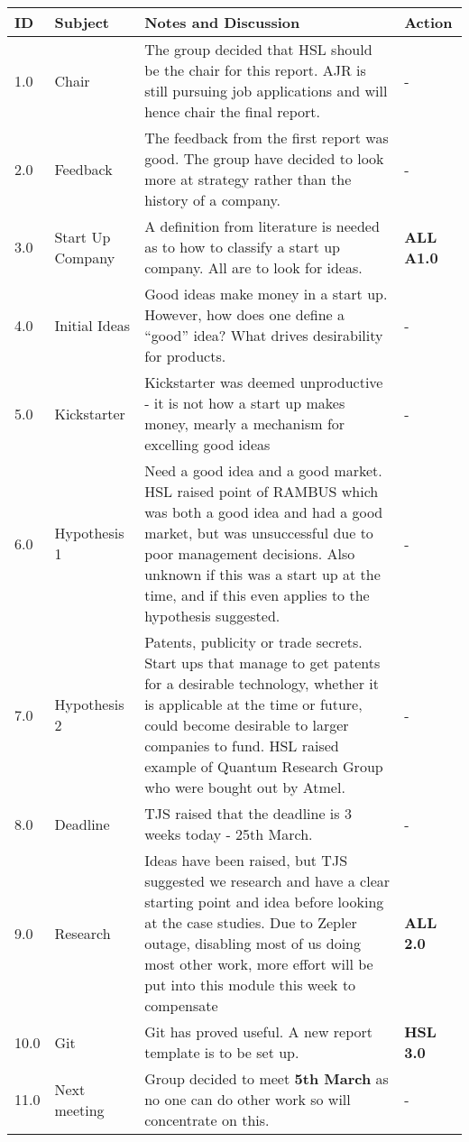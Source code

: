 \begin{center}
\begin{longtable}{| p{} |>{\raggedright\arraybackslash}p{} | p{} |>{\raggedright\arraybackslash}p{}|} \hline
\textbf{ID} & \textbf{Subject} & \textbf{Notes and Discussion} & \textbf{Action} \\ \hline
\endhead
1.0	&	Chair	&	The group decided that HSL should be the chair for this report. AJR is still pursuing job applications and will hence chair the final report. 	&   -	 \\ \hline
2.0	&	Feedback & The feedback from the first report was good. The group have decided to look more at strategy rather than the history of a company. & - \\ \hline
3.0 & Start Up Company & A definition from literature is needed as to how to classify a start up company. All are to look for ideas. &  \textbf{ALL A1.0} \\ \hline

4.0 & Initial Ideas & Good ideas make money in a start up. However, how does one define a ``good'' idea? What drives desirability for products. & - \\ \hline
5.0 & Kickstarter & Kickstarter was deemed unproductive - it is not how a start up makes money, mearly a mechanism for excelling good ideas & - \\ \hline
6.0 & Hypothesis 1 & Need a good idea and a good market. HSL raised point of RAMBUS which was both a good idea and had a good market, but was unsuccessful due to poor management decisions. Also unknown if this was a start up at the time, and if this even applies to the hypothesis suggested. & - \\ \hline
7.0 & Hypothesis 2 & Patents, publicity or trade secrets. Start ups that manage to get patents for a desirable technology, whether it is applicable at the time or future, could become desirable to larger companies to fund. HSL raised example of Quantum Research Group who were bought out by Atmel. & - \\ \hline

8.0 & Deadline & TJS raised that the deadline is 3 weeks today - 25th March. & - \\ \hline

9.0 & Research & Ideas have been raised, but TJS suggested we research and have a clear starting point and idea before looking at the case studies. Due to Zepler outage, disabling most of us doing most other work, more effort will be put into this module this week to compensate & \textbf{ALL 2.0} \\ \hline

10.0 & Git & Git has proved useful. A new report template is to be set up. & \textbf{HSL 3.0} \\ \hline

11.0 & Next meeting & Group decided to meet \textbf{5th March} as no one can do other work so will concentrate on this. & - \\ \hline

\end{longtable}
\end{center}

